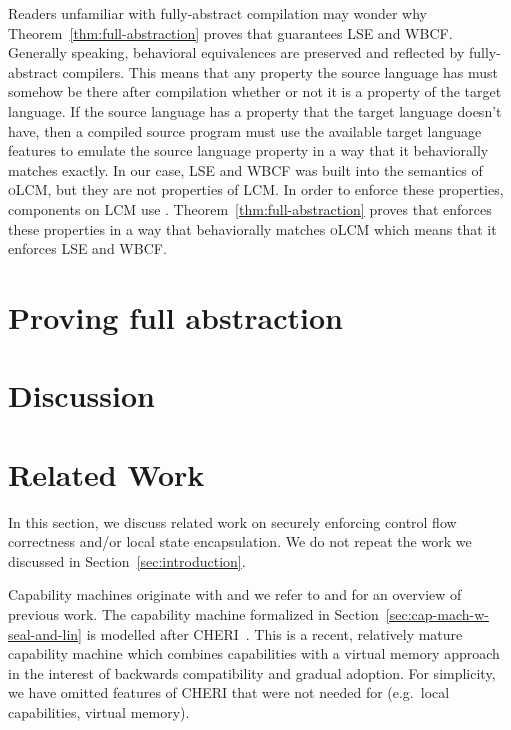 \documentclass[acmsmall,screen]{acmart}\settopmatter{}
\newcommand{\trgcm}{\textsc{LCM}}
\newcommand{\srccm}{\textsc{oLCM}}
\begin{document}
Readers unfamiliar with fully-abstract compilation may wonder why Theorem~\ref{thm:full-abstraction} proves that \stktokens{} guarantees LSE and WBCF.
Generally speaking, behavioral equivalences are preserved and reflected by fully-abstract compilers.
This means that any property the source language has must somehow be there after compilation whether or not it is a property of the target language.
If the source language has a property that the target language doesn't have, then a compiled source program must use the available target language features to emulate the source language property in a way that it behaviorally matches exactly.
In our case, LSE and WBCF was built into the semantics of \srccm{}, but they are not properties of \trgcm{}.
In order to enforce these properties, components on \trgcm{} use \stktokens{}.
Theorem~\ref{thm:full-abstraction} proves that \stktokens{} enforces these properties in a way that behaviorally matches \srccm{} which means that it enforces LSE and WBCF.



\section{Proving full abstraction}
\label{sec:fa-proof}


\section{Discussion}
\label{sec:discussion}


\section{Related Work}
In this section, we discuss related work on securely enforcing control flow correctness and/or local state encapsulation.
We do not repeat the work we discussed in Section~\ref{sec:introduction}.

Capability machines originate with \citet{dennis_programming_1966} and we refer to \citet{levy_capability-based_1984} and \citet{watson_cheri_2015} for an overview of previous work.
The capability machine formalized in Section~\ref{sec:cap-mach-w-seal-and-lin} is modelled after CHERI~\citep{watson_cheri_2015,woodruff_cheri_2014}.
This is a recent, relatively mature capability machine which combines capabilities with a virtual memory approach in the interest of backwards compatibility and gradual adoption.
For simplicity, we have omitted features of CHERI that were not needed for \stktokens{} (e.g.\ local capabilities, virtual memory).
\end{document}
